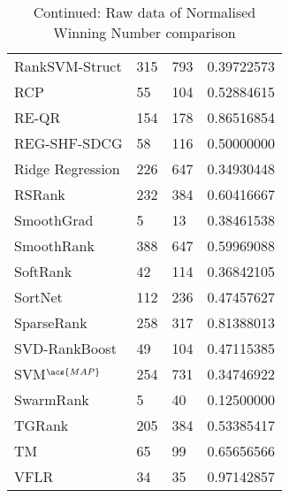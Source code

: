 \begin{table}
\begin{tabular}{l|l|l|l}
Rank\acs{SVM}-Struct & 315 & 793 & 0.39722573 \\ 
RCP & 55 & 104 & 0.52884615 \\ 
RE-QR & 154 & 178 & 0.86516854 \\ 
REG-SHF-SDCG & 58 & 116 & 0.50000000 \\ 
Ridge Regression & 226 & 647 & 0.34930448 \\ 
RSRank & 232 & 384 & 0.60416667 \\ 
SmoothGrad & 5 & 13 & 0.38461538 \\ 
SmoothRank & 388 & 647 & 0.59969088 \\ 
SoftRank & 42 & 114 & 0.36842105 \\ 
SortNet & 112 & 236 & 0.47457627 \\ 
SparseRank & 258 & 317 & 0.81388013 \\ 
\acs{SVD}-RankBoost & 49 & 104 & 0.47115385 \\ 
\acs{SVM}$^{\acs{MAP}}$ & 254 & 731 & 0.34746922 \\ 
SwarmRank & 5 & 40 & 0.12500000 \\ 
TGRank & 205 & 384 & 0.53385417 \\ 
TM & 65 & 99 & 0.65656566 \\ 
VFLR & 34 & 35 & 0.97142857 \\
\end{tabular}
\caption{Continued: Raw data of Normalised Winning Number comparison}
\label{tab:raw_data_norm_winnum_cntd}
\end{table}
